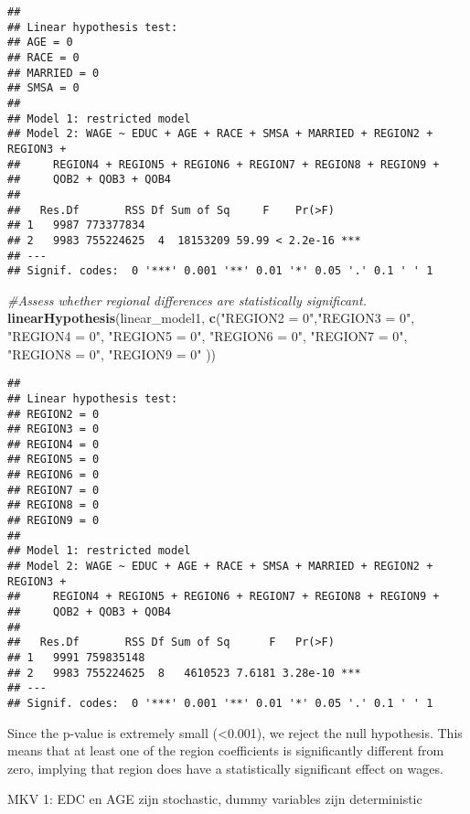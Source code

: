 \documentclass[
]{article}
\newenvironment{Shaded}{\begin{snugshade}}{\end{snugshade}}
\newcommand{\CommentTok}[1]{\textcolor[rgb]{0.56,0.35,0.01}{\textit{#1}}}
\newcommand{\FunctionTok}[1]{\textcolor[rgb]{0.13,0.29,0.53}{\textbf{#1}}}
\newcommand{\NormalTok}[1]{#1}
\newcommand{\StringTok}[1]{\textcolor[rgb]{0.31,0.60,0.02}{#1}}
\begin{document}
\begin{verbatim}
## 
## Linear hypothesis test:
## AGE = 0
## RACE = 0
## MARRIED = 0
## SMSA = 0
## 
## Model 1: restricted model
## Model 2: WAGE ~ EDUC + AGE + RACE + SMSA + MARRIED + REGION2 + REGION3 + 
##     REGION4 + REGION5 + REGION6 + REGION7 + REGION8 + REGION9 + 
##     QOB2 + QOB3 + QOB4
## 
##   Res.Df       RSS Df Sum of Sq     F    Pr(>F)    
## 1   9987 773377834                                 
## 2   9983 755224625  4  18153209 59.99 < 2.2e-16 ***
## ---
## Signif. codes:  0 '***' 0.001 '**' 0.01 '*' 0.05 '.' 0.1 ' ' 1
\end{verbatim}

\begin{Shaded}
\begin{Highlighting}[]
\CommentTok{\#Assess whether regional differences are statistically significant.}
\FunctionTok{linearHypothesis}\NormalTok{(linear\_model1, }\FunctionTok{c}\NormalTok{(}\StringTok{"REGION2 = 0"}\NormalTok{,}\StringTok{"REGION3 = 0"}\NormalTok{, }\StringTok{"REGION4 = 0"}\NormalTok{, }\StringTok{"REGION5 = 0"}\NormalTok{, }\StringTok{"REGION6 = 0"}\NormalTok{, }\StringTok{"REGION7 = 0"}\NormalTok{, }\StringTok{"REGION8 = 0"}\NormalTok{, }\StringTok{"REGION9 = 0"}\NormalTok{ ))}
\end{Highlighting}
\end{Shaded}

\begin{verbatim}
## 
## Linear hypothesis test:
## REGION2 = 0
## REGION3 = 0
## REGION4 = 0
## REGION5 = 0
## REGION6 = 0
## REGION7 = 0
## REGION8 = 0
## REGION9 = 0
## 
## Model 1: restricted model
## Model 2: WAGE ~ EDUC + AGE + RACE + SMSA + MARRIED + REGION2 + REGION3 + 
##     REGION4 + REGION5 + REGION6 + REGION7 + REGION8 + REGION9 + 
##     QOB2 + QOB3 + QOB4
## 
##   Res.Df       RSS Df Sum of Sq      F   Pr(>F)    
## 1   9991 759835148                                 
## 2   9983 755224625  8   4610523 7.6181 3.28e-10 ***
## ---
## Signif. codes:  0 '***' 0.001 '**' 0.01 '*' 0.05 '.' 0.1 ' ' 1
\end{verbatim}

Since the p-value is extremely small (\textless0.001), we reject the
null hypothesis. This means that at least one of the region coefficients
is significantly different from zero, implying that region does have a
statistically significant effect on wages.

MKV 1: EDC en AGE zijn stochastic, dummy variables zijn deterministic
\end{document}
